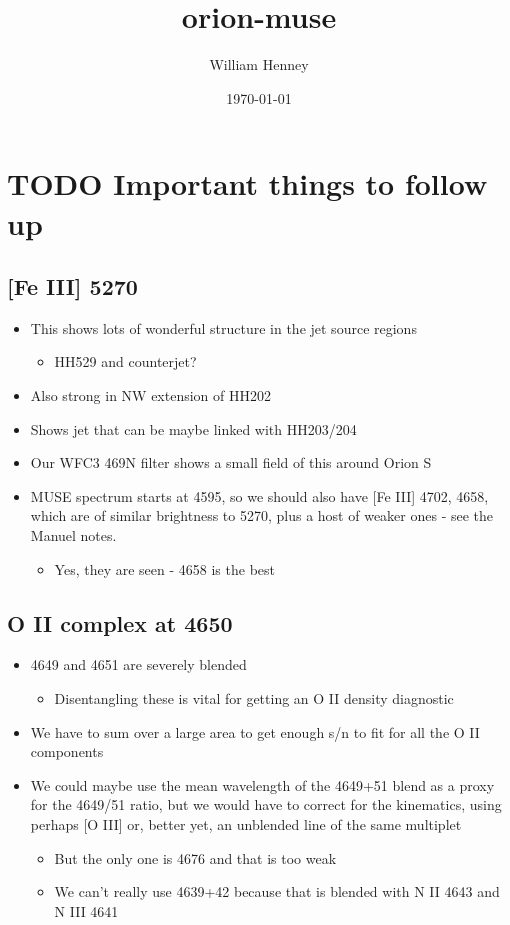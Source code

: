 \documentclass[11pt]{article}
\author{William Henney}
\date{\today}
\title{orion-muse}
\begin{document}
\maketitle
\tableofcontents

\section{{\bfseries\sffamily TODO} Important things to follow up}
\label{sec:orgheadline9}
\subsection{[Fe III] 5270}
\label{sec:orgheadline1}
\begin{itemize}
\item This shows lots of wonderful structure in the jet source regions
\begin{itemize}
\item HH529 and counterjet?
\end{itemize}
\item Also strong in NW extension of HH202
\item Shows jet that can be maybe linked with HH203/204
\item Our WFC3 469N filter shows a small field of this around Orion S
\item MUSE spectrum starts at 4595, so we should also have [Fe III] 4702, 4658, which are of similar brightness to 5270, plus a host of weaker ones - see the Manuel notes.
\begin{itemize}
\item Yes, they are seen - 4658 is the best
\end{itemize}
\end{itemize}
\subsection{O II complex at 4650}
\label{sec:orgheadline2}
\begin{itemize}
\item 4649 and 4651 are severely blended
\begin{itemize}
\item Disentangling these is vital for getting an O II density diagnostic
\end{itemize}
\item We have to sum over a large area to get enough s/n to fit for all the O II components
\item We could maybe use the mean wavelength of the 4649+51 blend as a proxy for the 4649/51 ratio, but we would have to correct for the kinematics, using perhaps [O III] or, better yet, an unblended line of the same multiplet
\begin{itemize}
\item But the only one is  4676 and that is too weak
\item We can't really use 4639+42 because that is blended with N II 4643 and N III 4641
\end{itemize}
\end{itemize}
\end{document}
